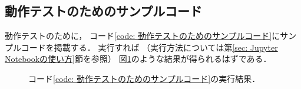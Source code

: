 \subsection{動作テストのためのサンプルコード}
動作テストのために，
コード\ref{code: 動作テストのためのサンプルコード}にサンプルコードを掲載する．
実行すれば
（実行方法については第\ref{sec: Jupyter Notebookの使い方}節を参照）
図\ref{fig: サンプルコードの実行結果}のような結果が得られるはずである．



\begin{figure}[htbp]
\centering
\setlength{\fboxsep}{0pt}
\caption{\label{fig: サンプルコードの実行結果}%
コード\ref{code: 動作テストのためのサンプルコード}の実行結果．
}
\end{figure}
